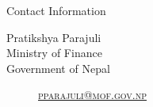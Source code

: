 \documentclass[
 size=14pt,
 paper=smartboard,  %
 mode=present, 		%
 display=slides, 	%
 style=tuliplab,  	%
 pauseslide,
 fleqn,leqno]{powerdot}
\begin{document}
\begin{wideslide}[toc=,bm=]{Contact Information}
\centering
{}
\twocolumn[
lcolwidth=0.35\linewidth,
rcolwidth=0.65\linewidth
]
{
}
{
Pratikshya Parajuli\\
Ministry of Finance\\
Government of Nepal
\begin{description}
 \item[\textcolor{orange}{\faEnvelope}] \href{mailto:pparajuli@mof.gov.np}
 {\textsc{\footnotesize{pparajuli@mof.gov.np}}}

\end{description}
}
\end{wideslide}
\end{document}
